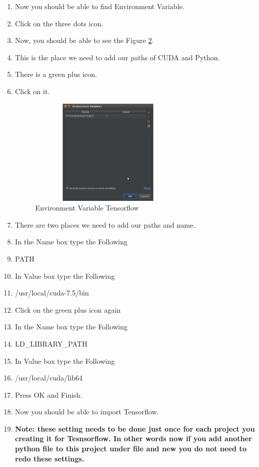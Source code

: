 \documentclass[12pt]{article}
\begin{document}
\begin{enumerate}
\begin{figure}[h]
	\label{fig:5_1}
\end{figure}
  \item Now you should be able to find Environment Variable.
  \item Click on the three dots icon.
  \item Now, you should be able to see the Figure \ref{fig:6_1}.
  \item This is the place we need to add our paths of CUDA and Python.
  \item There is a green plus icon.
  \item Click on it.
\begin{figure}[ht]
	\centerline{\includegraphics[width=3in, height=2in]{fig/6.eps}}
	\caption{Environment Variable Tensorflow}
	\label{fig:6_1}
\end{figure}
  \item There are two places we need to add our paths and name.
  \item In the Name box type the Following
  \item PATH
  \item In Value box type the Following
  \item /usr/local/cuda-7.5/bin
  \item Click on the green plus icon again
  \item In the Name box type the Following
  \item LD\_LIBRARY\_PATH
  \item In Value box type the Following
  \item /usr/local/cuda/lib64
  \item Press OK and Finish.
  \item Now you should be able to import Tensorflow.
  \item \textbf{Note: these setting needs to be done just once for each project you creating it for Tesnsorflow. In other words now if you add another python file to this project under file and new you do not need to redo these settings.}
\end{enumerate}
\end{document}
